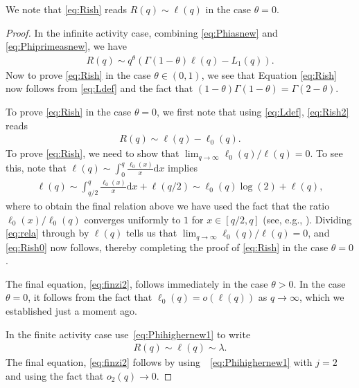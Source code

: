 \documentclass[a4,12pt]{amsart}
\numberwithin{equation}{section}
\begin{document}
We note that \eqref{eq:Rish} reads $R(q) \sim \ell(q)$ in the case $\theta = 0$. 
\begin{proof}
In the infinite activity case, combining \eqref{eq:Phiasnew} and \eqref{eq:Phiprimeasnew}, we have
\begin{align} \label{eq:Rish2}
R(q) \sim q^\theta ( \Gamma(1-\theta)\ell(q) - L_1(q)).
\end{align} 
Now to prove \eqref{eq:Rish} in the case $\theta \in (0,1)$, we see that Equation \eqref{eq:Rish} now follows from \eqref{eq:Ldef} and the fact that $(1-\theta)\Gamma(1-\theta) = \Gamma(2-\theta)$.

To prove \eqref{eq:Rish} in the case $\theta = 0$, we first note that using \eqref{eq:Ldef}, \eqref{eq:Rish2} reads 
\begin{align} \label{eq:Rish0}
R(q) \sim \ell(q) - \ell_0(q).
\end{align}
To prove \eqref{eq:Rish}, we need to show that $\lim_{q \to \infty} \ell_0(q)/\ell(q) = 0$. To see this, note that $\ell(q) \sim \int_0^q \frac{\ell_0(x)}{x} \mathrm{d}x$ implies
\begin{align} \label{eq:rela}
\ell(q) \sim \int_{q/2}^q \frac{\ell_0(x)}{x} \mathrm{d}x + \ell(q/2) \sim \ell_0(q) \log (2) + \ell(q),
\end{align}
where to obtain the final relation above we have used the fact that the ratio $\ell_0(x)/\ell_0(q)$ converges uniformly to $1$ for $x \in [q/2,q]$ (see, e.g., \cite[Section 1.2]{bingham1989regular}). Dividing \eqref{eq:rela} through by $\ell(q)$ tells us that $\lim_{q \to \infty} \ell_0(q)/\ell(q) = 0$, and \eqref{eq:Rish0} now follows, thereby completing the proof of \eqref{eq:Rish} in the case $\theta = 0$. 
\medskip


The final equation, \eqref{eq:finzi2}, follows immediately in the case $\theta  > 0$. In the case $\theta = 0$, it follows from the fact that $\ell_0(q) = o(\ell(q))$ as $q \to \infty$, which we established just a moment ago. 

In the finite activity case use~\eqref{eq:Phihighernew1} to write
\begin{align*}
R(q) \sim \ell(q) \sim \lambda.
\end{align*}
The final equation, \eqref{eq:finzi2} follows by using~~\eqref{eq:Phihighernew1} with $j=2$ and using the fact that
$o_2(q) \to 0$.

\end{proof}
\end{document}
